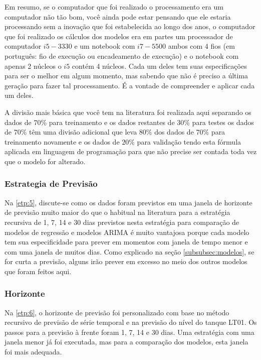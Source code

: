 Em resumo, se o computador que foi realizado o processamento era um computador não tão bom, você ainda pode estar pensando que ele estaria processando sem a inovação que foi estabelecida ao longo dos anos, o computador que foi realizado os cálculos dos modelos era em partes um processador de computador $i5-3330 $ e um notebook com $i7-5500 $ ambos com 4 fios (em português: fio de execução ou encadeamento de execução) e o notebook com apenas 2 núcleos o $i5 $ contém 4 núcleos. Cada um deles tem suas especificações para ser o melhor em algum momento, mas sabendo que não é preciso a última geração para fazer tal processamento. É a vontade de compreender e aplicar cada um deles.

A divisão mais básica que você tem na literatura foi realizada aqui separando os dados de $70\%$ para treinamento e os dados restantes de $30\%$ para testes os dados de $70\%$ têm uma divisão adicional que leva $80\%$ dos dados de $70\%$ para treinamento novamente e os dados de $20\%$ para validação tendo esta fórmula aplicada em linguagem de programação para que não precise ser contada toda vez que o modelo for alterado.


\subsubsection{Estrategia de Previs\~ao}\label{subsubsec:est}

Na \ref{etp:5}, discute-se como os dados foram previstos em uma janela de horizonte de previsão muito maior do que o habitual na literatura para a estratégia recursiva de 1, 7, 14 e 30 dias previstos nesta estratégia para comparação de modelos de regressão e modelos ARIMA é muito vantajosa porque cada modelo tem sua especificidade para prever em momentos com janela de tempo menor e com uma janela de muitos dias. Como explicado na seção \ref{subsubsec:modelos}, se for curta a previsão, alguns irão prever em excesso no meio dos outros modelos que foram feitos aqui.

\subsubsection{Horizonte}

Na \ref{etp:6}, o horizonte de previsão foi personalizado com base no método recursivo de previsão de série temporal e na previsão do nível do tanque LT01. Os passos para a previsão à frente foram 1, 7, 14 e 30 dias. Uma estratégia com uma janela menor já foi executada, mas para a comparação dos modelos, esta janela foi mais adequada.


